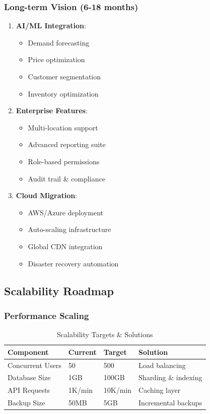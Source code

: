 \documentclass[12pt,a4paper]{article}
\begin{document}
\subsubsection{Long-term Vision (6-18 months)}
\begin{enumerate}
    \item \textbf{AI/ML Integration}:
       \begin{itemize}
           \item Demand forecasting
           \item Price optimization
           \item Customer segmentation
           \item Inventory optimization
       \end{itemize}
    
    \item \textbf{Enterprise Features}:
       \begin{itemize}
           \item Multi-location support
           \item Advanced reporting suite
           \item Role-based permissions
           \item Audit trail \& compliance
       \end{itemize}
    
    \item \textbf{Cloud Migration}:
       \begin{itemize}
           \item AWS/Azure deployment
           \item Auto-scaling infrastructure
           \item Global CDN integration
           \item Disaster recovery automation
       \end{itemize}
\end{enumerate}

\subsection{Scalability Roadmap}
\subsubsection{Performance Scaling}
\begin{table}[H]
\centering
\begin{tabular}{@{}llll@{}}
\toprule
\textbf{Component} & \textbf{Current} & \textbf{Target} & \textbf{Solution} \\
\midrule
Concurrent Users & 50 & 500 & Load balancing \\
Database Size & 1GB & 100GB & Sharding \& indexing \\
API Requests & 1K/min & 10K/min & Caching layer \\
Backup Size & 50MB & 5GB & Incremental backups \\
\bottomrule
\end{tabular}
\caption{Scalability Targets \& Solutions}
\end{table}
\end{document}
